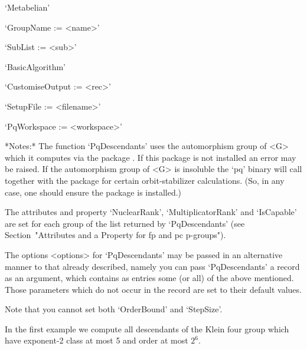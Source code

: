 \item{}`Metabelian'

\item{}`GroupName := <name>'

\item{}`SubList := <sub>'

\item{}`BasicAlgorithm'

\item{}`CustomiseOutput := <rec>'

\item{}`SetupFile := <filename>'

\item{}`PqWorkspace := <workspace>'

\endlist

*Notes:*
The function `PqDescendants' uses the automorphism group of <G> which  it
computes via the package {\AutPGrp}. If this package is not installed  an
error may be raised. If the automorphism group of <G>  is  insoluble  the
`pq' binary will call {\GAP} together with  the  {\AutPGrp}  package  for
certain orbit-stabilizer calculations.  (So,  in  any  case,  one  should
ensure the {\AutPGrp} package is installed.)

The  attributes  and  property  `NuclearRank',  `MultiplicatorRank'   and
`IsCapable'  are  set  for  each  group   of   the   list   returned   by
`PqDescendants' (see Section~"Attributes and a Property  for  fp  and  pc
p-groups").

The options <options> for `PqDescendants' may be passed in an alternative
manner to that already described, namely you can pass  `PqDescendants'  a
record as an argument, which contains as entries some  (or  all)  of  the
above mentioned. Those parameters which do not occur in  the  record  are
set to their default values.

Note that you cannot set both `OrderBound' and `StepSize'.

In the first example  we  compute all descendants of the Klein four group
which have exponent-2 class at most 5 and order at most $2^6$.

